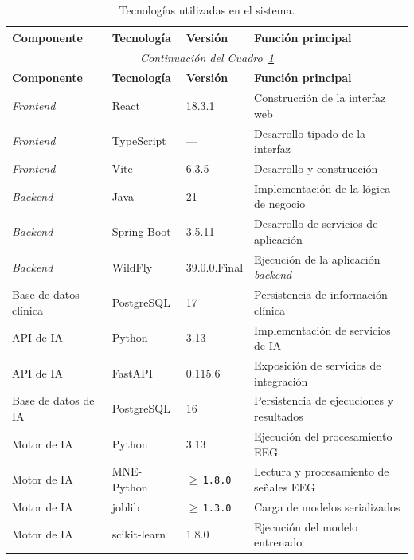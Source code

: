 \begin{longtable}{|
p{0.18\dimexpr\textwidth-8\tabcolsep-5\arrayrulewidth\relax}|
p{0.19\dimexpr\textwidth-8\tabcolsep-5\arrayrulewidth\relax}|
p{0.18\dimexpr\textwidth-8\tabcolsep-5\arrayrulewidth\relax}|
p{0.45\dimexpr\textwidth-8\tabcolsep-5\arrayrulewidth\relax}|}

\caption[Principales tecnologías utilizadas en el sistema]%
{Tecnologías utilizadas en el sistema.}
\label{tab:tecnologias}\\
\hline
\textbf{Componente} &
\textbf{Tecnología} &
\textbf{Versión} &
\textbf{Función principal} \\
\hline
\endfirsthead

\multicolumn{4}{c}{\textit{Continuación del Cuadro~\ref{tab:tecnologias}}}\\
\hline
\textbf{Componente} &
\textbf{Tecnología} &
\textbf{Versión} &
\textbf{Función principal} \\
\hline
\endhead

\textit{Frontend} & React & 18.3.1 &
Construcción de la interfaz web \\
\hline
\textit{Frontend} & TypeScript & --- &
Desarrollo tipado de la interfaz \\
\hline
\textit{Frontend} & Vite & 6.3.5 &
Desarrollo y construcción \\
\hline
\textit{Backend} & Java & 21 &
Implementación de la lógica de negocio \\
\hline
\textit{Backend} & Spring Boot & 3.5.11 &
Desarrollo de servicios de aplicación \\
\hline
\textit{Backend} & WildFly & 39.0.0.Final &
Ejecución de la aplicación \textit{backend} \\
\hline
Base de datos clínica & PostgreSQL & 17 &
Persistencia de información clínica \\
\hline
API de IA & Python & 3.13 &
Implementación de servicios de IA \\
\hline
API de IA & FastAPI & 0.115.6 &
Exposición de servicios de integración \\
\hline
Base de datos de IA & PostgreSQL & 16 &
Persistencia de ejecuciones y resultados \\
\hline
Motor de IA & Python & 3.13 &
Ejecución del procesamiento EEG \\
\hline
Motor de IA & MNE-Python & $\geq$\,\texttt{1.8.0} &
Lectura y procesamiento de señales EEG \\
\hline
Motor de IA & joblib & $\geq$\,\texttt{1.3.0} &
Carga de modelos serializados \\
\hline
Motor de IA & scikit-learn & 1.8.0 &
Ejecución del modelo entrenado \\
\hline

\end{longtable}
\endgroup


